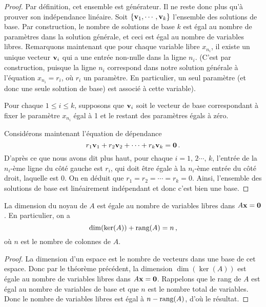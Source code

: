 \begin{proof}
Par définition, cet ensemble est g\'en\'erateur. Il ne reste donc plus qu'à prouver son indépendance linéaire.  Soit $\{\mathbf{v}_1, \cdots, \mathbf{v}_k\}$ l'ensemble des solutions de base.  
Par construction, le nombre de solutions de base $k$ est égal au nombre de paramètres dans la solution générale, et ceci est égal au nombre de variables libres.  
Remarquons maintenant que pour chaque variable libre $x_{n_i}$, 
il existe un  unique vecteur $\mathbf{v}_i$ qui a une entrée non-nulle dans la ligne $n_i$. 
(C'est par construction, puisque la ligne $n_i$ correspond dans notre solution générale \`a l'équation $x_{n_i} = r_i$, où $r_i$ un paramètre. En particulier, un seul paramètre (et donc une seule solution de base) est associ\'e à cette variable).

Pour chaque $1\leq i\leq k$, supposons que $\mathbf{v}_i$ soit le vecteur de base correspondant \`a fixer le paramètre $x_{n_i}$ égal à 1 et le restant des param\`etres égals à zéro.

Considérons maintenant l'équation de dépendance
$$
r_1 \mathbf{v}_1 + r_2 \mathbf{v}_2 + \cdots + r_k \mathbf{v}_k = \mathbf{0}\,.
$$
D'après ce que nous avons dit plus haut, pour chaque $i = 1,\, 2 \cdots,\, k$, 
l'entr\'ee de la $n_i$-ème ligne du c\^ot\'e gauche est $r_i$, qui
doit être égale \`a la $n_i$-ème entr\'ee du c\^ot\'e droit, laquelle est $0$.  On en
déduit que $r_1=r_2 = \cdots = r_k = 0$.  Ainsi, l'ensemble des solutions de base
est linéairement indépendant et donc c'est bien une base.
\end{proof}

\begin{corollary}\label{corollary:ranknull}

La dimension du noyau de $A$ est égale au nombre de variables libres dans
$A\mathbf{x}=\mathbf{0}$.  En particulier, on a 
$$
\dim (\ker(A)) + \textrm{rang}(A) = n\,, 
$$
où $n$ est le nombre de colonnes de $A$.
\end{corollary}

\begin{proof}
La dimension d'un espace est le nombre de vecteurs dans une base de cet espace.
Donc par le théorème précédent, la dimension $\dim(\ker(A))$ est égale au nombre de variables libres dans $A\mathbf{x}=\mathbf{0}$.  Rappelons que le rang de $A$ est égal au nombre de variables de base et que $n$ est le nombre total de variables. Donc le nombre de variables libres est égal à $n-\textrm{rang}(A)$, d'où le résultat.
\end{proof}



